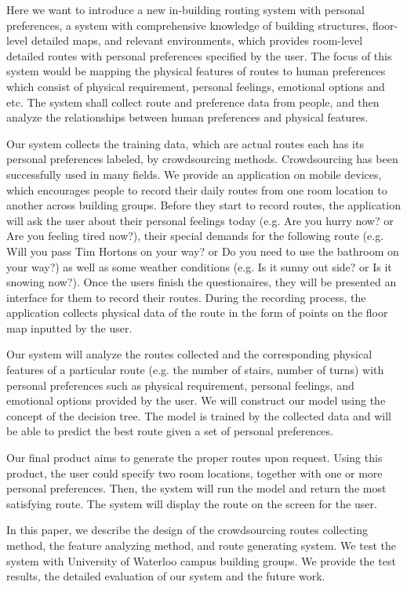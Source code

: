 \documentclass{sigchi}
\begin{document}
Here we want to introduce a new in-building routing system with personal preferences, a system with comprehensive knowledge of building structures, floor-level detailed maps, and relevant environments, which provides room-level detailed routes with personal preferences specified by the user. The focus of this system would be mapping the physical features of routes to human preferences which consist of physical requirement, personal feelings, emotional options and etc. The system shall collect route and preference data from people, and then analyze the relationships between human preferences and physical features.


Our system collects the training data, which are actual routes each has its personal preferences labeled, by crowdsourcing methods. Crowdsourcing has been successfully used in many fields. We provide an application on mobile devices, which encourages people to record their daily routes from one room location to another across building groups. Before they start to record routes, the application will ask the user about their personal feelings today (e.g. Are you hurry now? or Are you feeling tired now?), their special demands for the following route (e.g. Will you pass Tim Hortons on your way? or Do you need to use the bathroom on your way?) as well as some weather conditions (e.g. Is it sunny out side? or Is it snowing now?). Once the users finish the questionaires, they will be presented an interface for them to record their routes. During the recording process, the application collects physical data of the route in the form of points on the floor map inputted by the user. 


Our system will analyze the routes collected and the corresponding physical features of a particular route (e.g. the number of stairs, number of turns) with personal preferences such as physical requirement, personal feelings, and emotional options provided by the user. We will construct our model using the concept of the decision tree. The model is trained by the collected data and will be able to predict the best route given a set of personal preferences.


Our final product aims to generate the proper routes upon request. Using this product, the user could specify two room locations, together with one or more personal preferences. Then, the system will run the model and return the most satisfying route. The system will display the route on the screen for the user. 


In this paper, we describe the design of the crowdsourcing routes collecting method, the feature analyzing method, and route generating system. We test the system with University of Waterloo campus building groups. We provide the test results, the detailed evaluation of our system and the future work.
\end{document}
